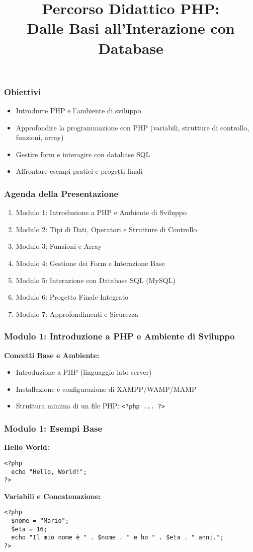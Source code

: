 \documentclass{beamer}
\title{Percorso Didattico PHP:\\ Dalle Basi all'Interazione con Database}
\author{}
\date{}
\begin{document}
\frame{\titlepage}

\begin{frame}
\frametitle{Obiettivi}
\begin{itemize}
    \item Introdurre PHP e l'ambiente di sviluppo
    \item Approfondire la programmazione con PHP (variabili, strutture di controllo, funzioni, array)
    \item Gestire form e interagire con database SQL
    \item Affrontare esempi pratici e progetti finali
\end{itemize}
\end{frame}

\begin{frame}
\frametitle{Agenda della Presentazione}
\begin{enumerate}
    \item Modulo 1: Introduzione a PHP e Ambiente di Sviluppo
    \item Modulo 2: Tipi di Dati, Operatori e Strutture di Controllo
    \item Modulo 3: Funzioni e Array
    \item Modulo 4: Gestione dei Form e Interazione Base
    \item Modulo 5: Interazione con Database SQL (MySQL)
    \item Modulo 6: Progetto Finale Integrato
    \item Modulo 7: Approfondimenti e Sicurezza
\end{enumerate}
\end{frame}


\begin{frame}
\frametitle{Modulo 1: Introduzione a PHP e Ambiente di Sviluppo}
\textbf{Concetti Base e Ambiente:}
\begin{itemize}
    \item Introduzione a PHP (linguaggio lato server)
    \item Installazione e configurazione di XAMPP/WAMP/MAMP
    \item Struttura minima di un file PHP: \texttt{\textless ?php ... ?\textgreater}
\end{itemize}
\end{frame}

\begin{frame}[fragile]
\frametitle{Modulo 1: Esempi Base}
\textbf{Hello World:}
\begin{lstlisting}
<?php
  echo "Hello, World!";
?>
\end{lstlisting}
\vspace{0.5em}
\textbf{Variabili e Concatenazione:}
\begin{lstlisting}
<?php
  $nome = "Mario";
  $eta = 16;
  echo "Il mio nome è " . $nome . " e ho " . $eta . " anni.";
?>
\end{lstlisting}
\end{frame}
\end{document}
